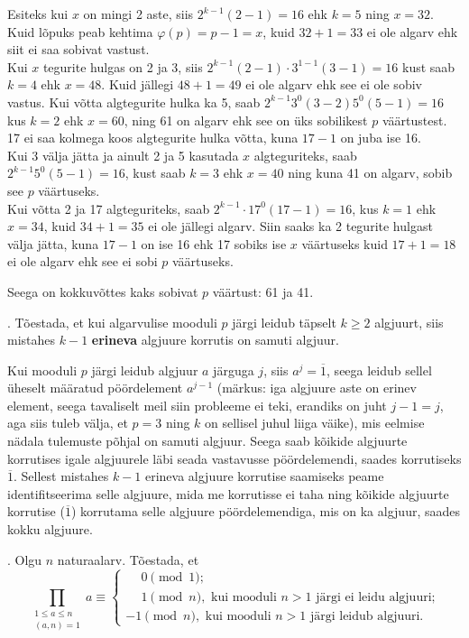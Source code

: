 \documentclass[a4paper, 10pt]{article}
\newcommand{\w}{\overline}
\begin{document}
Esiteks kui $x$ on mingi 2 aste, siis $2^{k-1}(2-1)=16$ ehk $k=5$ ning $x=32$. Kuid lõpuks peab kehtima $\varphi(p)=p-1=x$, kuid $32+1=33$ ei ole algarv ehk siit ei saa sobivat vastust.\\
Kui $x$ tegurite hulgas on 2 ja 3, siis $2^{k-1}(2-1)\cdot3^{1-1}(3-1)=16$ kust saab $k=4$ ehk $x=48$. Kuid jällegi $48+1=49$ ei ole algarv ehk see ei ole sobiv vastus. Kui võtta algtegurite hulka ka 5, saab $2^{k-1}3^0(3-2)5^0(5-1)=16$ kus $k=2$ ehk $x=60$, ning 61 on algarv ehk see on üks sobilikest $p$ väärtustest. 17 ei saa kolmega koos algtegurite hulka võtta, kuna $17-1$ on juba ise 16.\\
Kui 3 välja jätta ja ainult 2 ja 5 kasutada $x$ algteguriteks, saab $2^{k-1}5^0(5-1)=16$, kust saab $k=3$ ehk $x=40$ ning kuna 41 on algarv, sobib see $p$ väärtuseks.\\
Kui võtta 2 ja 17 algteguriteks, saab $2^{k-1}\cdot17^0(17-1)=16$, kus $k=1$ ehk $x=34$, kuid $34+1=35$ ei ole jällegi algarv. Siin saaks ka 2 tegurite hulgast välja jätta, kuna $17-1$ on ise 16 ehk 17 sobiks ise $x$ väärtuseks kuid $17+1=18$ ei ole algarv ehk see ei sobi $p$ väärtuseks.

Seega on kokkuvõttes kaks sobivat $p$ väärtust: 61 ja 41. 
\bigskip

. Tõestada, et kui algarvulise mooduli $p$ järgi leidub täpselt $k\geq 2$ algjuurt, siis mistahes $k-1$ {\bf erineva} algjuure korrutis on samuti algjuur. 

\bigskip
Kui mooduli $p$ järgi leidub algjuur $a$ järguga $j$, siis $a^j=\w{1}$, seega leidub sellel üheselt määratud pöördelement $a^{j-1}$ (märkus: iga algjuure aste on erinev element, seega tavaliselt meil siin probleeme ei teki, erandiks on juht $j-1=j$, aga siis tuleb välja, et $p=3$ ning $k$ on sellisel juhul liiga väike), mis eelmise nädala tulemuste põhjal on samuti algjuur. Seega saab kõikide algjuurte korrutises igale algjuurele läbi seada vastavusse pöördelemendi, saades korrutiseks $\w{1}$. Sellest mistahes $k-1$ erineva algjuure korrutise saamiseks peame identifitseerima selle algjuure, mida me korrutisse ei taha ning kõikide algjuurte korrutise ($\w{1}$) korrutama selle algjuure pöördelemendiga, mis on ka algjuur, saades kokku algjuure.

. Olgu $n$ naturaalarv. Tõestada, et $$\prod\limits_{\substack{1\leq a \leq n\\(a,n)=1}}a\equiv\begin{cases}
\phantom{-}0\pmod{1};\\
\phantom{-}1\pmod{n},\text{ kui mooduli }n>1 \text{ järgi ei leidu algjuuri;}\\
-1\pmod{n},\text{ kui mooduli }n>1 \text{ järgi leidub algjuuri.}
\end{cases}$$
\end{document}
